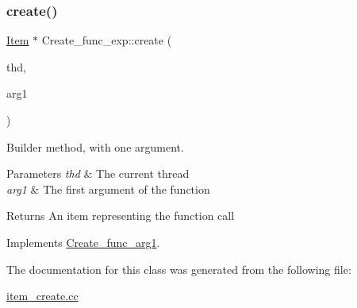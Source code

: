 \subsubsection{\texorpdfstring{create()}{create()}}
{\footnotesize\ttfamily \mbox{\hyperlink{classItem}{Item}} $\ast$ Create\+\_\+func\+\_\+exp\+::create (\begin{DoxyParamCaption}\item[{T\+HD $\ast$}]{thd,  }\item[{\mbox{\hyperlink{classItem}{Item}} $\ast$}]{arg1 }\end{DoxyParamCaption})\hspace{0.3cm}{\ttfamily [virtual]}}

Builder method, with one argument. 
\begin{DoxyParams}{Parameters}
{\em thd} & The current thread \\
\hline
{\em arg1} & The first argument of the function \\
\hline
\end{DoxyParams}
\begin{DoxyReturn}{Returns}
An item representing the function call 
\end{DoxyReturn}


Implements \mbox{\hyperlink{classCreate__func__arg1_a3e9a98f755cd82c3e762e334c955a8c9}{Create\+\_\+func\+\_\+arg1}}.



The documentation for this class was generated from the following file\+:\begin{DoxyCompactItemize}
\item 
\mbox{\hyperlink{item__create_8cc}{item\+\_\+create.\+cc}}\end{DoxyCompactItemize}
